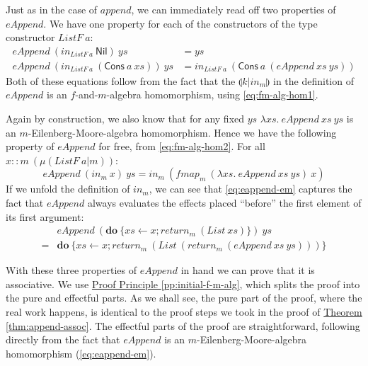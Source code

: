 \documentclass{jfp1}
\newcommand{\eFold}[2]{\llparenthesis #1|#2 \rrparenthesis}
\newcommand{\proofprinref}[1]{\hyperref[#1]{Proof Principle \ref*{#1}}}
\newcommand{\thmref}[1]{\hyperref[#1]{Theorem \ref*{#1}}}
\begin{document}
Just as in the case of $\mathit{append}$, we can immediately read off
two properties of $\mathit{eAppend}$. We have one property for each of
the constructors of the type constructor $\mathit{ListF}~a$:
\begin{align}
  \label{eq:eAppend-nil}
  \mathit{eAppend}~(\mathit{in}_{\mathit{ListF}~a}~\mathsf{Nil})~\mathit{ys} & = \mathit{ys} \\
  \label{eq:eAppend-cons}
  \mathit{eAppend}~(\mathit{in}_{\mathit{ListF}~a}~(\mathsf{Cons}~a~\mathit{xs}))~\mathit{ys} & = \mathit{in}_{\mathit{ListF}~a}~(\mathsf{Cons}~a~(\mathit{eAppend}~\mathit{xs}~\mathit{ys}))
\end{align}
Both of these equations follow from the fact that the
$\eFold{k}{\mathit{in}_m}$ in the definition of $\mathit{eAppend}$ is
an $f$-and-$m$-algebra homomorphism, using \autoref{eq:fm-alg-hom1}.

Again by construction, we also know that for any fixed $\mathit{ys}$
$\lambda \mathit{xs}.~\mathit{eAppend}~\mathit{xs}~\mathit{ys}$ is an
$m$-Eilenberg-Moore-algebra homomorphism. Hence we have the following
property of $\mathit{eAppend}$ for free, from
\autoref{eq:fm-alg-hom2}. For all $x :: m~(\mu(\mathit{ListF}~a|m))$:
\begin{equation}\label{eq:eappend-em}
  \mathit{eAppend}~(\mathit{in}_m~\mathit{x})~\mathit{ys} = \mathit{in}_m~(\mathit{fmap}_m~(\lambda \mathit{xs}.~\mathit{eAppend}~\mathit{xs}~\mathit{ys})~\mathit{x})
\end{equation}
If we unfold the definition of $\mathit{in}_m$, we can see that
\autoref{eq:eappend-em} captures the fact that $\mathit{eAppend}$
always evaluates the effects placed ``before'' the first element of
its first argument:
\begin{displaymath}
  \begin{array}{ll}
     & \mathit{eAppend}~(\mathbf{do}~\{\mathit{xs} \leftarrow x; \mathit{return}_m~(\mathit{List}~\mathit{xs}) \})~\mathit{ys} \\
    =& \mathbf{do}~\{ \mathit{xs} \leftarrow x; \mathit{return}_m~(\mathit{List}~(\mathit{return}_m~(\mathit{eAppend}~\mathit{xs}~\mathit{ys}))) \}
  \end{array}
\end{displaymath}

With these three properties of $\mathit{eAppend}$ in hand we can prove
that it is associative. We use \proofprinref{pp:initial-f-m-alg},
which splits the proof into the pure and effectful parts. As we shall
see, the pure part of the proof, where the real work happens, is
identical to the proof steps we took in the proof of
\thmref{thm:append-assoc}. The effectful parts of the proof are
straightforward, following directly from the fact that
$\mathit{eAppend}$ is an $m$-Eilenberg-Moore-algebra homomorphism
(\autoref{eq:eappend-em}).
\end{document}

